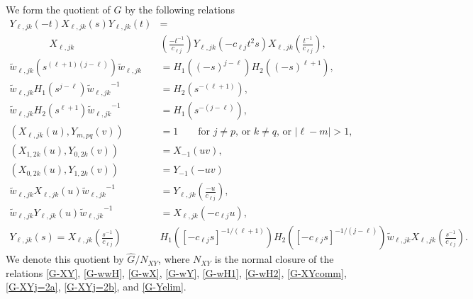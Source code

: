 \documentclass[11pt,letterpaper]{amsart}
\numberwithin{thecounter}{section}
\theoremstyle{definition}
\begin{document}
We form the quotient of $\widehat{G}$ by the following  relations
\begin{align*}
\tag{Im:2}\label{G-XY}
  Y_{\ell,jk}(-t)X_{\ell,jk}(s)Y_{\ell,jk}(t)&= \\
  \qquad \qquad X_{\ell,jk}&\left(\frac{-t^{-1}}{c_{\ell j}}\right)Y_{\ell,jk}\left(-c_{\ell j}t^2s\right)X_{\ell,jk}\left(\frac{t^{-1}}{c_{\ell j}}\right),\\
\tag{Im:3}\label{G-wwH}
\widetilde{w}_{\ell,jk}\left(s^{(\ell+1)(j-\ell)} \right)\widetilde{w}_{\ell,jk}&=H_1\left((-s)^{j-\ell}\right) H_2\left((-s)^{\ell+1}\right), \\
\tag{Im:5a}\label{G-wH1}
  \widetilde{w}_{\ell,jk} H_1\left(s^{j-\ell} \right) {\widetilde{w}_{\ell,jk}}^{-1}&=  H_2\left(s^{-(\ell+1)}\right),\\
\tag{Im:5b}\label{G-wH2}
  \widetilde{w}_{\ell,jk} H_2\left(s^{\ell+1} \right) {\widetilde{w}_{\ell,jk}}^{-1}&=  H_1\left(s^{-(j-\ell)}\right),\\
\tag{U:2}\label{G-XYcomm}
  (X_{\ell,jk}(u), Y_{m,pq}(v))&=1\qquad\text{for $j\neq p$, or $k\neq q$, or $|\ell-m|>1$,}\\
\tag{U:3a}\label{G-XYj=2a} (X_{1,2k}(u),Y_{0,2k}(v))&=X_{-1}(uv),\\
\tag{U:3b}\label{G-XYj=2b}(X_{0,2k}(u),Y_{1,2k}(v))&=Y_{-1}(-uv)\\
\tag{Im:4a}\label{G-wX}
  \widetilde{w}_{\ell,jk} X_{\ell,jk}(u) {\widetilde{w}_{\ell,jk}}^{-1}&= Y_{\ell,jk}\left(\frac{-u}{c_{\ell j}}\right),\\
\tag{Im:4b}\label{G-wY}
  \widetilde{w}_{\ell,jk} Y_{\ell,jk}(u) {\widetilde{w}_{\ell,jk}}^{-1}&= X_{\ell,jk}\left(-c_{\ell j}u \right),\\
 \tag{U:5b} \label{G-Yelim}
Y_{\ell,jk}(s) =
X_{\ell,jk}\left(\frac{ s^{-1}}{c_{\ell j}}\right)
&H_1\left(\left[-{{c_{\ell j}}}s\right]^{-1/(\ell+1)}\right)
H_2\left(\left[-{{c_{\ell j}}}s\right]^{-1/(j-\ell)}\right)\widetilde{w}_{\ell,jk}X_{\ell,jk}\left(\frac{ s^{-1}}{c_{\ell j}}\right).
\end{align*}
We denote this quotient by $\widehat{G}/N_{XY}$, where $N_{XY}$ is the normal closure of the relations  \eqref{G-XY}, \eqref{G-wwH}, \eqref{G-wX}, \eqref{G-wY},
\eqref{G-wH1}, \eqref{G-wH2},  \eqref{G-XYcomm}, \eqref{G-XYj=2a}, \eqref{G-XYj=2b}, and \eqref {G-Yelim}.
\end{document}
